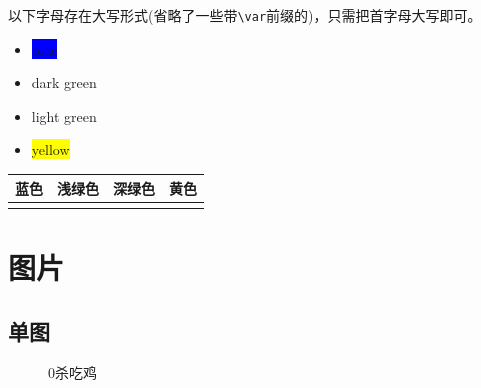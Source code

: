 \documentclass[12pt, a4paper, oneside]{ctexart}
\begin{document}
以下字母存在大写形式(省略了一些带\verb|\var|前缀的)，只需把首字母大写即可。

\begin{itemize}
    \item \colorbox{blue}{blue}
    \item \colorbox{dark_green}{dark green}
    \item \colorbox{light_green}{light green}
    \item \colorbox{yellow}{yellow}
\end{itemize}


\begin{table}[htbp]
    \centering
    \begin{tabular}{cccc}
        \toprule
        \textbf{蓝色}                      & \textbf{浅绿色}                            & \textbf{深绿色}                           & \textbf{黄色}                        \\
        \midrule
        \cellcolor{blue}\footnotemark[1] & \cellcolor{light_green}\footnotemark[2] & \cellcolor{dark_green}\footnotemark[3] & \cellcolor{yellow}\footnotemark[4] \\
        \bottomrule
    \end{tabular}
\end{table}

\newpage

\section{图片}
\subsection{单图}
\begin{figure} [htbp!]

    \caption{0杀吃鸡}
    \label{fig1}
\end{figure}
\end{document}
